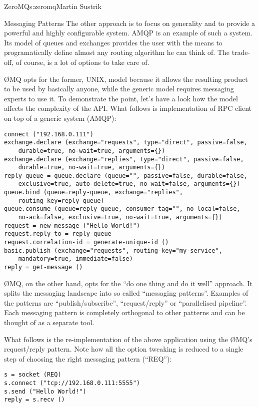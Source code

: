 \begin{aosachapter}{ZeroMQ}{s:zeromq}{Martin Sustrik}
\begin{aosasect1}{Messaging Patterns}
The other approach is to focus on generality and to provide a powerful
and highly configurable system. AMQP is an example of such a
system. Its model of queues and exchanges provides the user with the
means to programatically define almost any routing algorithm he can
think of. The trade-off, of course, is a lot of options to take care
of.

ØMQ opts for the former, UNIX, model because it allows the resulting
product to be used by basically anyone, while the generic model
requires messaging experts to use it. To demonstrate the point, let's
have a look how the model affects the complexity of the API. What
follows is implementation of RPC client on top of a generic system
(AMQP):

\begin{verbatim}
connect ("192.168.0.111")
exchange.declare (exchange="requests", type="direct", passive=false,
    durable=true, no-wait=true, arguments={})
exchange.declare (exchange="replies", type="direct", passive=false,
    durable=true, no-wait=true, arguments={})
reply-queue = queue.declare (queue="", passive=false, durable=false,
    exclusive=true, auto-delete=true, no-wait=false, arguments={})
queue.bind (queue=reply-queue, exchange="replies",
    routing-key=reply-queue)
queue.consume (queue=reply-queue, consumer-tag="", no-local=false,
    no-ack=false, exclusive=true, no-wait=true, arguments={})
request = new-message ("Hello World!")
request.reply-to = reply-queue
request.correlation-id = generate-unique-id ()
basic.publish (exchange="requests", routing-key="my-service",
    mandatory=true, immediate=false)
reply = get-message ()
\end{verbatim}

ØMQ, on the other hand, opts for the ``do one thing and do it well''
approach. It splits the messaging landscape into so called ``messaging
patterns''. Examples of the patterns are ``publish/subscribe'',
``request/reply'' or ``parallelised pipeline''. Each messaging pattern
is completely orthogonal to other patterns and can be thought of as a
separate tool.

What follows is the re-implementation of the above application using
the ØMQ's request/reply pattern. Note how all the option tweaking is
reduced to a single step of choosing the right messaging pattern
(``REQ''):

\begin{verbatim}
s = socket (REQ)
s.connect ("tcp://192.168.0.111:5555")
s.send ("Hello World!")
reply = s.recv ()
\end{verbatim}


\end{aosasect1}
\end{aosachapter}
